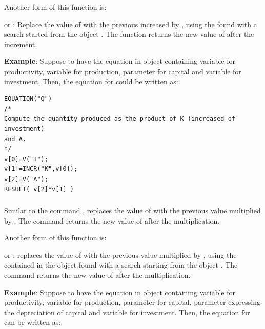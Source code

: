 \documentclass [11pt,a4paper] {book}
\begin{document}
Another form of this function is:
\begin{list}{-}{\itemsep -0.2cm}
\item {} or : Replace the value of  with the previous increased by , using the  found with a search started from the object . The function returns the
new value of  after the increment.

\end{list}

\textbf{Example}: Suppose to have the equation in object  containing variable
 for productivity, variable  for production, parameter  for capital
and variable  for investment. Then, the equation for  could be written as:

 \small
\begin{verbatim}
EQUATION("Q")
/*
Compute the quantity produced as the product of K (increased of investment)
and A.
*/
v[0]=V("I");
v[1]=INCR("K",v[0]);
v[2]=V("A");
RESULT( v[2]*v[1] )
\end{verbatim}
\normalsize

\subsubsection{ }
Similar to the command , replaces the value of  with the previous value multiplied by . The command returns the new value of  after the multiplication.

Another form of this function is:
\begin{list}{-}{\itemsep -0.2cm}
\item {} or : replaces the value of  with the previous value multiplied by , using the  contained in the object found with a search starting from the object . The command returns the new value of  after the multiplication.

\end{list}

\textbf{Example}: Suppose to have the equation in object  containing variable
 for productivity, variable  for production, parameter  for capital,
parameter  expressing the depreciation of capital and variable  for investment. Then, the equation for  can be written as:
\end{document}
